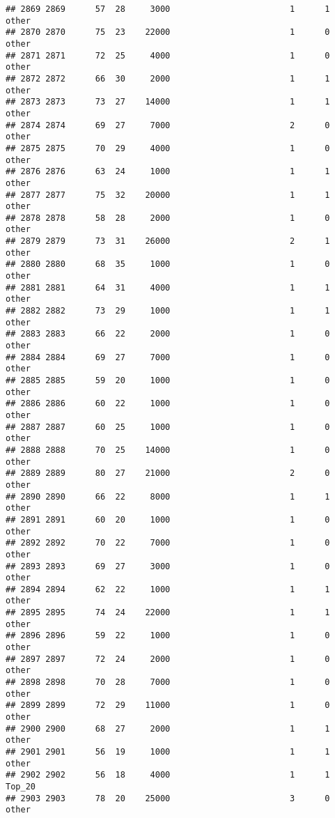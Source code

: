 \documentclass[
]{article}
\begin{document}
\begin{verbatim}
## 2869 2869      57  28     3000                        1      1    other
## 2870 2870      75  23    22000                        1      0    other
## 2871 2871      72  25     4000                        1      0    other
## 2872 2872      66  30     2000                        1      1    other
## 2873 2873      73  27    14000                        1      1    other
## 2874 2874      69  27     7000                        2      0    other
## 2875 2875      70  29     4000                        1      0    other
## 2876 2876      63  24     1000                        1      1    other
## 2877 2877      75  32    20000                        1      1    other
## 2878 2878      58  28     2000                        1      0    other
## 2879 2879      73  31    26000                        2      1    other
## 2880 2880      68  35     1000                        1      0    other
## 2881 2881      64  31     4000                        1      1    other
## 2882 2882      73  29     1000                        1      1    other
## 2883 2883      66  22     2000                        1      0    other
## 2884 2884      69  27     7000                        1      0    other
## 2885 2885      59  20     1000                        1      0    other
## 2886 2886      60  22     1000                        1      0    other
## 2887 2887      60  25     1000                        1      0    other
## 2888 2888      70  25    14000                        1      0    other
## 2889 2889      80  27    21000                        2      0    other
## 2890 2890      66  22     8000                        1      1    other
## 2891 2891      60  20     1000                        1      0    other
## 2892 2892      70  22     7000                        1      0    other
## 2893 2893      69  27     3000                        1      0    other
## 2894 2894      62  22     1000                        1      1    other
## 2895 2895      74  24    22000                        1      1    other
## 2896 2896      59  22     1000                        1      0    other
## 2897 2897      72  24     2000                        1      0    other
## 2898 2898      70  28     7000                        1      0    other
## 2899 2899      72  29    11000                        1      0    other
## 2900 2900      68  27     2000                        1      1    other
## 2901 2901      56  19     1000                        1      1    other
## 2902 2902      56  18     4000                        1      1   Top_20
## 2903 2903      78  20    25000                        3      0    other

\end{verbatim}
\end{document}
